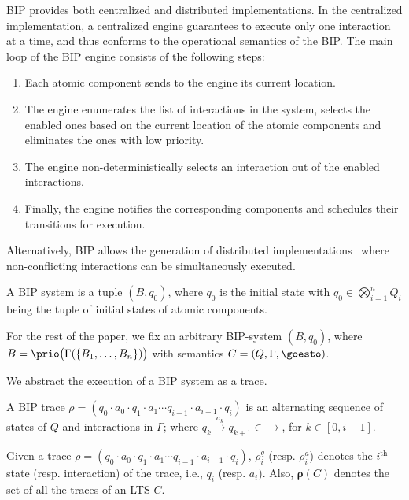 BIP provides both centralized and distributed implementations. In the centralized implementation,
a centralized engine guarantees to execute only one interaction at a time, and thus conforms to the operational semantics of the BIP.  The main loop of the BIP engine consists of the following steps:
\begin{enumerate}
\item Each atomic component sends to the engine its current
location.
\item The engine enumerates the list of interactions in the system,
selects the enabled ones based on the current location
of the atomic components and eliminates the ones
with low priority.
\item The engine non-deterministically selects an interaction
out of the enabled interactions.
\item Finally, the engine notifies the corresponding components
and schedules their transitions for execution.
\end{enumerate}

Alternatively, BIP allows the generation of distributed
implementations~\cite{bip-distributed} where non-conflicting interactions
can be simultaneously executed.

\begin{definition}
\label{def:bipsystem}
A BIP system is a tuple $(B, q_0)$, where $q_0$ is the initial state with $q_0 \in \bigotimes_{i=1}^n Q_i$ being the tuple of initial states of atomic components.
\end{definition}


For the rest of the paper, we fix an arbitrary BIP-system $(B, q_0)$, where  $B = \prio\big(\Gamma(\{B_1, \ldots, B_n\})\big)$ with semantics $C = (Q, \Gamma, \goesto)$.

We abstract the execution of a BIP system as a trace.
%
\begin{definition}
\label{def:trace-global}
A BIP trace $\rho = (q_0 \cdot a_0 \cdot q_1 \cdot a_1 \cdots q_{i-1} \cdot a_{i-1} \cdot q_i)$ is an alternating sequence of states of $Q$ and interactions in $\Gamma$; where $q_k \xrightarrow{a_k} q_{k+1} \in \rightarrow$, for $k \in [0, i-1]$.
\end{definition}

Given a trace $\rho = (q_0 \cdot a_0 \cdot q_1 \cdot a_1 \cdots q_{i-1} \cdot a_{i-1} \cdot q_i)$, 
$\rho^q_i$ (resp. $\rho^a_i$) denotes the $i^\text{th}$ state (resp. interaction) of the trace, i.e., $q_i$ (resp. $a_i$). Also, $\bm{\rho}(C)$ denotes the set of all the traces of an LTS $C$. 

